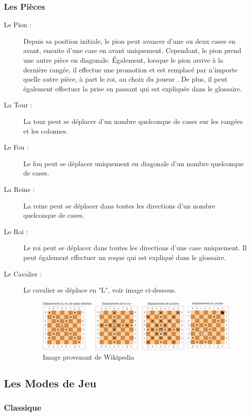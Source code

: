 \documentclass[10pt, a4paper]{article}
\begin{document}
			\subsubsection{Les Pièces}
			\begin{description}
		  \item[Le Pion :] Depuis sa position initiale, le pion peut avancer d'une ou deux cases en avant, ensuite d'une case en avant uniquement. Cependant, le pion prend une autre pièce en diagonale. Également, lorsque le pion arrive à la dernière rangée, il effectue une promotion et est remplacé par n'importe quelle autre pièce, à part le roi, au choix du joueur \label{promote}. De plus, il peut également effectuer la prise en passant qui est expliquée dans le glossaire.
			\item[La Tour :] La tour peut se déplacer d'un nombre quelconque de cases sur les rangées et les colonnes.
			\item[Le Fou :] Le fou peut se déplacer uniquement en diagonale d'un nombre quelconque de cases.
			\item[La Reine :] La reine peut se déplacer dans toutes les directions d'un nombre quelconque de cases.
			\item[Le Roi :] Le roi peut se déplacer dans toutes les directions d'une case uniquement. Il peut également effectuer un roque qui est expliqué dans le glossaire.
			\item[Le Cavalier :] Le cavalier se déplace en "L", voir image ci-dessous.
			\begin{figure}[bh]
			\centering
			\includegraphics[scale=0.50]{pieces_move.png}
			\caption{Image provenant de Wikipedia}
			\end{figure}
			\end{description}
			\clearpage

			\subsection{Les Modes de Jeu}
				\subsubsection{Classique}
\end{document}
